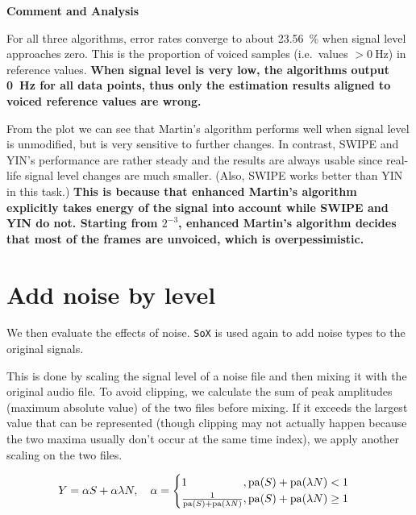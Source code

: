 \documentclass[11pt,a4paper]{report}
\begin{document}
\begin{mdframed}
\textbf{Comment and Analysis}

\bigskip

For all three algorithms, error rates converge to about \SI{23.56}{\percent} when signal level approaches zero.
This is the proportion of voiced samples (i.e.\, values \( > \SI{0}{\hertz} \)) in reference values.
\textbf{When signal level is very low, the algorithms output \SI{0}{\hertz} for all data points, thus only the estimation results aligned to voiced reference values are wrong.}

\smallskip

From the plot we can see that Martin's algorithm performs well when signal level is unmodified, but is very sensitive to further changes.
In contrast, SWIPE and YIN's performance are rather steady and the results are always usable since real-life signal level changes are much smaller.
(Also, SWIPE works better than YIN in this task.) \textbf{This is because that enhanced Martin's algorithm explicitly takes energy of the signal into account while SWIPE and YIN do not.
Starting from \(2^{-3}\), enhanced Martin's algorithm decides that most of the frames are unvoiced, which is overpessimistic.}
\end{mdframed}

\section{Add noise by level}

We then evaluate the effects of noise.
\texttt{SoX} is used again to add noise types to the original signals.

This is done by scaling the signal level of a noise file and then mixing it with the original audio file.
To avoid clipping, we calculate the sum of peak amplitudes (maximum absolute value) of the two files before mixing.
If it exceeds the largest value that can be represented (though clipping may not actually happen because the two maxima usually don't occur at the same time index), we apply another scaling on the two files.

\begin{equation}
  Y = \alpha S + \alpha \lambda N, \quad
  \alpha = \begin{cases}
    \mathrlap{1}\hphantom{\frac{1}{\mathrm{pa}(S) + \mathrm{pa}(\lambda N)}}, \mathrm{pa}(S) + \mathrm{pa}(\lambda N) < 1 \\
    \frac{1}{\mathrm{pa}(S) + \mathrm{pa}(\lambda N)}, \mathrm{pa}(S) + \mathrm{pa}(\lambda N) \geq 1
  \end{cases}
\end{equation}
\end{document}
